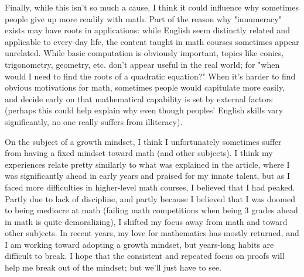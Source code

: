 \documentclass{homework}
\begin{document}
Finally, while this isn't so much a cause, I think it could influence why sometimes people give up
more readily with math. Part of the reason why "innumeracy" exists may have roots in applications:
while English seem distinctly related and applicable to every-day life, the content taught in math
courses sometimes appear unrelated. While basic computation is obviously important, topics like
conics, trigonometry, geometry, etc. don't appear useful in the real world; for "when would I need
to find the roots of a quadratic equation?" When it's harder to find obvious motivations for math,
sometimes people would capitulate more easily, and decide early on that mathematical capability is
set by external factors (perhaps this could help explain why even though peoples' English skills
vary significantly, no one really suffers from illiteracy).


On the subject of a growth mindset, I think I unfortunately sometimes suffer from having a fixed
mindset toward math (and other subjects). I think my experiences relate pretty similarly to what was
explained in the article, where I was significantly ahead in early years and praised for my innate
talent, but as I faced more difficulties in higher-level math courses, I believed that I had peaked.
Partly due to lack of discipline, and partly because I believed that I was doomed to being mediocre
at math (failing math competitions when being 3 grades ahead in math is quite demoralizing), I
shifted my focus away from math and toward other subjects. In recent years, my love for mathematics
has mostly returned, and I am working toward adopting a growth mindset, but years-long habits are
difficult to break. I hope that the consistent and repeated focus on proofs will help me break out
of the mindset; but we'll just have to see.
\end{document}
